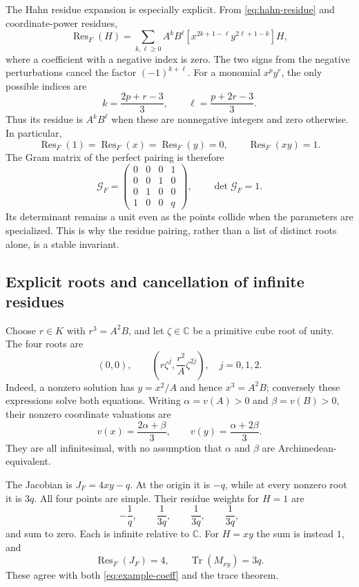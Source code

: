 \documentclass[11pt,letterpaper]{article}
\theoremstyle{definition}
\theoremstyle{remark}
\newcommand{\C}{\mathbb C}
\newcommand{\Res}{\operatorname{Res}}
\newcommand{\Tr}{\operatorname{Tr}}
\numberwithin{equation}{section}
\begin{document}
The Hahn residue expansion is especially explicit. From \eqref{eq:hahn-residue} and coordinate-power residues,
\begin{equation}\label{eq:example-coeff}
 \Res_F(H)=\sum_{k,\ell\ge0}A^kB^\ell
 [x^{2k+1-\ell}y^{2\ell+1-k}]H,
\end{equation}
where a coefficient with a negative index is zero. The two signs from the negative perturbations cancel the factor $(-1)^{k+\ell}$. For a monomial $x^py^r$, the only possible indices are
\[
 k=\frac{2p+r-3}{3},\qquad
 \ell=\frac{p+2r-3}{3}.
\]
Thus its residue is $A^kB^\ell$ when these are nonnegative integers and zero otherwise. In particular,
\[
 \Res_F(1)=\Res_F(x)=\Res_F(y)=0,\qquad \Res_F(xy)=1.
\]
The Gram matrix of the perfect pairing is therefore
\begin{equation}\label{eq:example-gram}
 \mathcal G_F=
 \begin{pmatrix}
 0&0&0&1\\
 0&0&1&0\\
 0&1&0&0\\
 1&0&0&q
 \end{pmatrix},\qquad \det\mathcal G_F=1.
\end{equation}
Its determinant remains a unit even as the points collide when the parameters are specialized. This is why the residue pairing, rather than a list of distinct roots alone, is a stable invariant.

\subsection{Explicit roots and cancellation of infinite residues}
Choose $r\in K$ with $r^3=A^2B$, and let $\zeta\in\C$ be a primitive cube root of unity. The four roots are
\begin{equation}\label{eq:four-roots}
 (0,0),\qquad
 \left(r\zeta^j,\frac{r^2}{A}\zeta^{2j}\right),\quad j=0,1,2.
\end{equation}
Indeed, a nonzero solution has $y=x^2/A$ and hence $x^3=A^2B$; conversely these expressions solve both equations. Writing $\alpha=v(A)>0$ and $\beta=v(B)>0$, their nonzero coordinate valuations are
\begin{equation}\label{eq:four-valuations}
 v(x)=\frac{2\alpha+\beta}{3},\qquad
 v(y)=\frac{\alpha+2\beta}{3}.
\end{equation}
They are all infinitesimal, with no assumption that $\alpha$ and $\beta$ are Archimedean-equivalent.

The Jacobian is $J_F=4xy-q$. At the origin it is $-q$, while at every nonzero root it is $3q$. All four points are simple. Their residue weights for $H=1$ are
\[
 -\frac1q,\qquad \frac1{3q},\qquad\frac1{3q},\qquad\frac1{3q},
\]
and sum to zero. Each is infinite relative to $\C$. For $H=xy$ the sum is instead $1$, and
\[
 \Res_F(J_F)=4,\qquad \Tr(M_{xy})=3q.
\]
These agree with both \eqref{eq:example-coeff} and the trace theorem.
\end{document}
